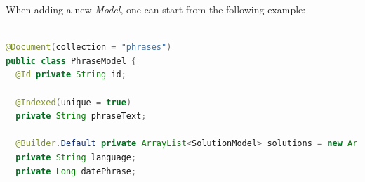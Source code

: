 When adding a new \textit{Model}, one can start from the following example:
\begin{lstlisting}[language=Java]

@Document(collection = "phrases")
public class PhraseModel {
  @Id private String id;

  @Indexed(unique = true)
  private String phraseText;

  @Builder.Default private ArrayList<SolutionModel> solutions = new ArrayList<>();
  private String language;
  private Long datePhrase;
 \end{lstlisting}
 
